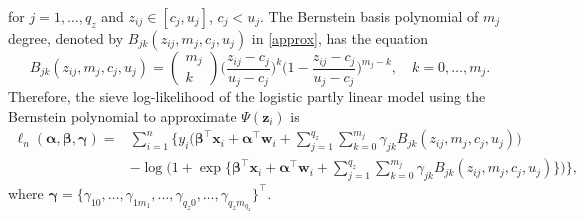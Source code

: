 \documentclass[11pt]{article}
\begin{document}
for $j=1,\ldots,q_z$ and $z_{ij} \in [c_j, u_j]$, $c_j<u_j$. The Bernstein basis polynomial of $m_j$ degree, denoted by $B_{jk} (z_{ij}, m_j, c_j, u_j)$ in \eqref{approx}, has the equation
$$
B_{jk}(z_{ij}, m_j, c_j, u_j) = \begin{pmatrix} m_j \\ k \end{pmatrix} \Bigg( \frac{z_{ij} - c_j}{u_j - c_j} \Bigg)^k \Bigg(1 - \frac{z_{ij} - c_j}{u_j - c_j} \Bigg)^{m_j - k}, \quad k = 0,\ldots,m_j.
$$
Therefore, the sieve log-likelihood of the logistic partly linear model using the Bernstein polynomial to approximate $\Psi(\textbf{z}_i)$ is
\begin{equation}\label{loglikeLPLM}
\begin{split}
\ell_n(\boldsymbol{\alpha}, \boldsymbol{\beta}, \boldsymbol{\gamma}) = & \sum^n_{i=1} \bigg\{ y_i  \Big(\boldsymbol{\beta}^\top \textbf{x}_i + \boldsymbol{\alpha}^\top \textbf{w}_i + \sum^{q_z}_{j=1} \sum^{m_j}_{k=0} \gamma_{jk} B_{jk}(z_{ij},m_j,c_j,u_j) \Big) \\
& -\log\Big(1+ \exp\big\{ \boldsymbol{\beta}^\top \textbf{x}_i + \boldsymbol{\alpha}^\top \textbf{w}_i + \sum^{q_z}_{j=1} \sum^{m_j}_{k=0} \gamma_{jk} B_{jk}(z_{ij},m_j,c_j,u_j)\big\} \Big) \bigg\},
\end{split}
\end{equation}
where $\boldsymbol{\gamma} = \{ \gamma_{10},\ldots,\gamma_{1m_{1}},\ldots,\gamma_{q_{z}0},\ldots,\gamma_{q_{z}m_{q_z}} \}^\top $.
\end{document}

